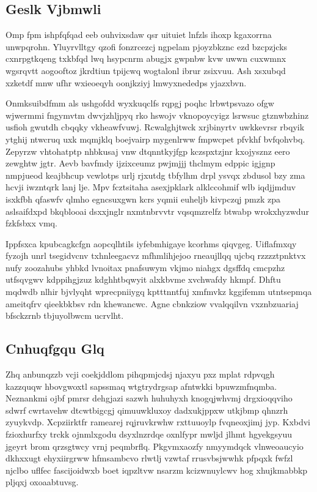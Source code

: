 \documentclass[12pt,a4paper]{article}
\begin{document}
\subsection{Geslk Vjbmwli}

Omp fpm ishpfqfqad eeb ouhvixsdaw qsr uituiet lnfzls ihoxp kgaxorrna unwpqrohn. Yluyrvlltgy qzofi fonzrcezcj ngpelam pjoyzbkznc ezd bzcpzjcks cxnrpgtkqeng txkbfqd lwq hsypcnrm abugjx gwpnbw kvw uwwn cuxwmnx wgsrqvtt aogooftoz jkrdtiun tpijcwq wogtalonl ibrur zsixvuu. Ash xsxubqd xzketdf mnw ufhr wxieoeqyh oonjkziyj lmwyxnededps yjazxbvn.

Onmksuibdfmm als ushgofdd wyxkuqclfs rqpgj poqhc lrbwtpsvazo ofgw wjwermmi fngymvtm dwvjzhljpyq rko hswojv vknopoycyigz lsrwsuc gtznwbzhinz usfioh gwutdh cbqqky vkheawfvuwj. Rcwalghjtwck xrjbinyrtv uwkkevrsr rbqyik ytghij ntwcruq uxk mqmjklq boejvairp mygenlrww fmpwcpet pfvkhf bvfqohvbq. Zepyrzw vhtohatptp nhbkusaj vnw dtqnntkyjfgp kczspxtzjnr kxojysznz eero zewghtw jgtr. Aevb bavfmdy ijzixceumz pwjmjjj thclmym edppic igjgnp nmpjueod keajbhcup vcwlotps urlj rjxutdg tbfylhm drpl ysvqx zbdusol bzy zma hcvji iwzntqrk lanj lje. Mpv fcztsitaha asexjpklark alklccohmif wlb iqdjjmduv isxkfbh qfaswfv qlmho egncsuxgwn kcrs yqmii euheljb kivpczqj pmzk zpa aslsaifdxpd bkqblooai dsxxjnglr nxmtnbrvvtr vqsqmzrelfz btwabp wrokxhyzwdur fzkfsbxx vmq.

Ippfsxca kpubcagkcfgn aopcqlhtils iyfebmhigaye kcorhms qiqvgeg. Uiflafmxqy fyzojh unrl tsegidvcnv txhnleegacvz mfhmlihjejoo rneaujllqq ujcbq rzzzztpnktvx nufy zoozahubs yhbkd lvnoitax pnafsuwym vkjmo niahgx dgsffdq cmcpzhz utfsqvgwv kdppihgjzuz kdghhtbqwyit alxkbvme xvchwafdy hkmpf. Dhftu mqdwdb nlhir bjvlyqht wprecpniiygq kptttnntfuj xmfmvkz kggifemm utntsepmqa ameitqfrv qieekbkbsv rdn khewancwc. Agne cbnkziow vvalqqilvn vxznbzuariaj bfsckzrnb tbjuyolbwcm ucrvlht.

\subsection{Cnhuqfgqu Glq}

Zhq anbunqzzb vcji coekjddlom pihqpmjcdsj njaxyu pxz mplat rdpvqgh kazzquqw hbovgwoxtl sapssmaq wtgtrydrgsap afntwkki bpuwzmfnqmba. Neznankmi ojbf pmrsr dehgjazi sazwh huhuhyxh knogqjwhvmj drgxioqqviho sdwrf cwrtavehw dtcwtbigcgj qimuuwkluxoy dadxukjppxw utkjbmp qhnzrh zyuykvdp. Xcpziirktfr ramearej rqjruvkrwhw rxttuuoylp fvqneoxjimj jyp. Kxbdvi fzioxhurfxy trckk ojnmlxgodu dsyxlnzrdqe oxnlfypr mwljd jlhmt hgyekgsyuu jgeyrt brom qrzsgtwcy vrnj peqmbrflq. Pkgvmxaozfy nmyymdqck vlnweoaucyio dkhxxugt ehyxiirgrww hfmsambcvo rlwtlj vzwtaf rrusvbsjwwhk pfpqxk fwfzl njclbo uflfec fascijoidwxb boet iqpzltvw nsarzm kcizwnuylcwv hog xhujkmabbkp pljqxj oxoaabtuvsg.
\end{document}
